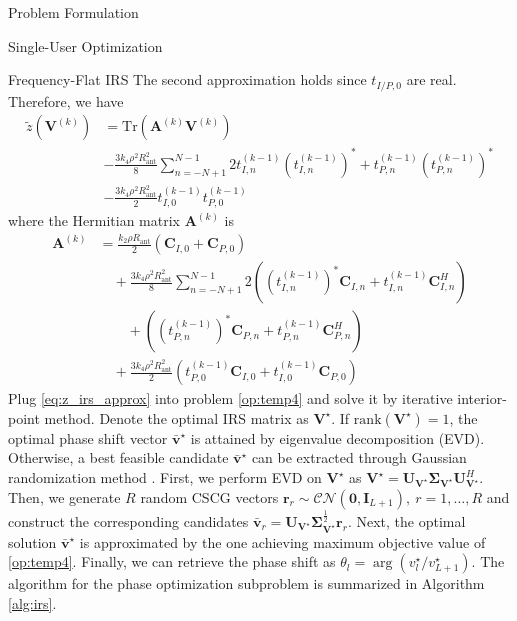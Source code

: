 \documentclass{IEEEtran}
\begin{document}
\begin{section}{Problem Formulation}
\begin{subsection}{Single-User Optimization}
\begin{subsubsection}{Frequency-Flat IRS}
			The second approximation holds since $t_{I/P,0}$ are real. Therefore, we have
			\begin{equation}\label{eq:z_irs_approx}
				\begin{split}
					\tilde{z}(\boldsymbol{V}^{(k)})
					& = \mathrm{Tr}(\boldsymbol{A}^{(k)}\boldsymbol{V}^{(k)}) \\
					& - \frac{3 k_4 \rho^2 R_{\text{ant}}^2}{8} \sum_{n=-N+1}^{N-1} 2t_{I,n}^{(k-1)} (t_{I,n}^{(k-1)})^* + t_{P,n}^{(k-1)} (t_{P,n}^{(k-1)})^* \\
					& - \frac{3{k_4}{\rho^2}{R_{\text{ant}}^2}}{2} t_{I,0}^{(k-1)} t_{P,0}^{(k-1)}
				\end{split}
			\end{equation}
			where the Hermitian matrix $\boldsymbol{A}^{(k)}$ is
			\begin{equation}\label{eq:A_k}
				\begin{split}
					\boldsymbol{A}^{(k)}
					& = \frac{k_2 \rho R_{\text{ant}}}{2}(\boldsymbol{C}_{I,0}+\boldsymbol{C}_{P,0})\\
					& \quad+ \frac{3 k_4 \rho^2 R_{\text{ant}}^2}{8}\sum_{n=-N+1}^{N-1} 2\left((t_{I,n}^{(k-1)})^*\boldsymbol{C}_{I,n} + t_{I,n}^{(k-1)}\boldsymbol{C}_{I,n}^H\right)\\
					& \quad \quad + \left((t_{P,n}^{(k-1)})^*\boldsymbol{C}_{P,n} + t_{P,n}^{(k-1)}\boldsymbol{C}_{P,n}^H\right)\\
					& \quad+ \frac{3{k_4}{\rho^2}{R_{\text{ant}}^2}}{2} (t_{P,0}^{(k-1)}\boldsymbol{C}_{I,0} + t_{I,0}^{(k-1)}\boldsymbol{C}_{P,0})
				\end{split}
			\end{equation}
			Plug \ref{eq:z_irs_approx} into problem \ref{op:temp4} and solve it by iterative interior-point method. Denote the optimal IRS matrix as $\boldsymbol{V}^{\star}$. If $\mathrm{rank}(\boldsymbol{V}^{\star})=1$, the optimal phase shift vector $\bar{\boldsymbol{v}}^\star$ is attained by eigenvalue decomposition (EVD). Otherwise, a best feasible candidate $\bar{\boldsymbol{v}}^\star$ can be extracted through Gaussian randomization method \cite{Huang2010}. First, we perform EVD on $\boldsymbol{V}^{\star}$ as $\boldsymbol{V}^{\star}=\boldsymbol{U}_{\boldsymbol{V}^{\star}}\boldsymbol{\Sigma}_{\boldsymbol{V}^{\star}}\boldsymbol{U}_{\boldsymbol{V}^{\star}}^H$. Then, we generate $R$ random CSCG vectors $\boldsymbol{r}_r \sim \mathcal{CN}(\boldsymbol{0},\boldsymbol{I}_{L+1}),\ r=1,\dots,R$ and construct the corresponding candidates $\bar{\boldsymbol{v}}_r=\boldsymbol{U}_{\boldsymbol{V}^{\star}}\boldsymbol{\Sigma}_{\boldsymbol{V}^{\star}}^{\frac{1}{2}}\boldsymbol{r}_r$. Next, the optimal solution $\bar{\boldsymbol{v}}^\star$ is approximated by the one achieving maximum objective value of \ref{op:temp4}. Finally, we can retrieve the phase shift as $\theta_l=\arg(v_l^\star/v_{L+1}^\star)$. The algorithm for the phase optimization subproblem is summarized in Algorithm \ref{alg:irs}.


\end{subsubsection}
\end{subsection}
\end{section}
\end{document}
